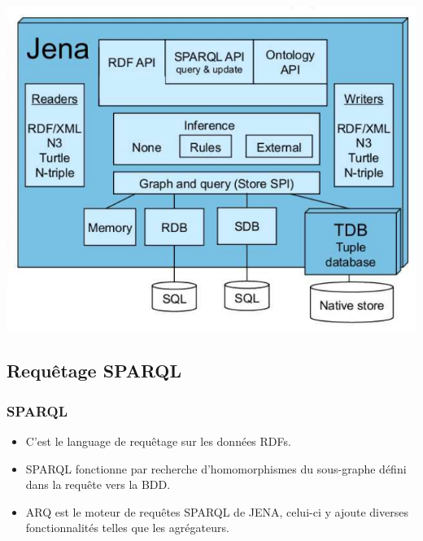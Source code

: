 \documentclass[12pt]{beamer}
\begin{document}
\begin{frame}
\begin{center}
\includegraphics[scale=0.4]{archi_jena.jpeg} 

\label{fig_jena}
\end{center}



\end{frame}
\subsection{Requêtage SPARQL}

\begin{frame}
\frametitle{SPARQL}
\begin{itemize}
\item C'est le language de requêtage sur les données RDFs.
\item SPARQL fonctionne par recherche d'homomorphismes du sous-graphe défini dans la requête vers la BDD.
\item ARQ est le moteur de requêtes SPARQL de JENA, celui-ci y ajoute diverses fonctionnalités telles que les agrégateurs.
\end{itemize}

\end{frame}
\end{document}

